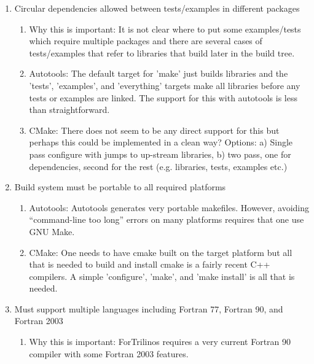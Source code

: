 \documentclass[pdf,ps2pdf,11pt]{SANDreport}
\begin{document}
\begin{enumerate}
{}\item Circular dependencies allowed between tests/examples in
different packages

  \begin{enumerate}

  {}\item Why this is important: It is not clear where to put some
  examples/tests which require multiple packages and there are
  several cases of tests/examples that refer to libraries that build
  later in the build tree.

  {}\item Autotools: The default target for 'make' just builds
  libraries and the 'tests', 'examples', and 'everything' targets
  make all libraries before any tests or examples are linked.  The
  support for this with autotools is less than straightforward.

  {}\item CMake: There does not seem to be any direct support for
  this but perhaps this could be implemented in a clean way? 
  Options: a) Single pass configure with jumps to up-stream
  libraries, b) two pass, one for dependencies, second for the rest
  (e.g. libraries, tests, examples etc.)

  \end{enumerate}

{}\item Build system must be portable to all required platforms

  \begin{enumerate}

  {}\item Autotools: Autotools generates very portable makefiles.
  However, avoiding ``command-line too long'' errors on many
  platforms requires that one use GNU Make.

  {}\item CMake: One needs to have cmake built on the target
  platform but all that is needed to build and install cmake is a
  fairly recent C++ compilers.  A simple 'configure', 'make', and
  'make install' is all that is needed. 

  \end{enumerate}

{}\item Must support multiple languages including Fortran 77,
Fortran 90, and Fortran 2003

  \begin{enumerate}

  {}\item Why this is important: ForTrilinos requires a very current
  Fortran 90 compiler with some Fortran 2003 features.


\end{enumerate}
\end{enumerate}
\end{document}
